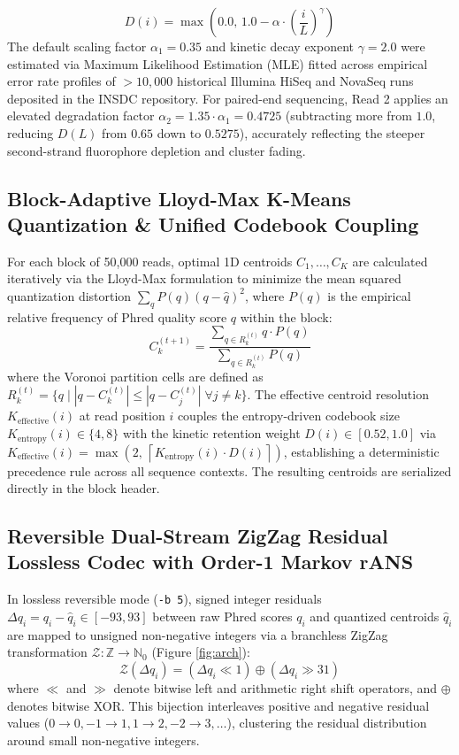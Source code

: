 \documentclass[10pt,twocolumn,a4paper]{article}
\begin{document}
\begin{equation}
D(i) = \max\left(0.0, \, 1.0 - \alpha \cdot \left(\frac{i}{L}\right)^\gamma\right)
\end{equation}
The default scaling factor $\alpha_1 = 0.35$ and kinetic decay exponent $\gamma = 2.0$ were estimated via Maximum Likelihood Estimation (MLE) fitted across empirical error rate profiles of $>10,000$ historical Illumina HiSeq and NovaSeq runs deposited in the INSDC repository. For paired-end sequencing, Read 2 applies an elevated degradation factor $\alpha_2 = 1.35 \cdot \alpha_1 = 0.4725$ (subtracting more from $1.0$, reducing $D(L)$ from $0.65$ down to $0.5275$), accurately reflecting the steeper second-strand fluorophore depletion and cluster fading.

\subsection{Block-Adaptive Lloyd-Max K-Means Quantization \& Unified Codebook Coupling}
For each block of 50,000 reads, optimal 1D centroids $C_1, \dots, C_K$ are calculated iteratively via the Lloyd-Max formulation \cite{lloyd} to minimize the mean squared quantization distortion $\sum_{q} P(q)(q - \hat{q})^2$, where $P(q)$ is the empirical relative frequency of Phred quality score $q$ within the block:
\begin{equation}
C_k^{(t+1)} = \frac{\displaystyle\sum_{q \in R_k^{(t)}} q \cdot P(q)}{\displaystyle\sum_{q \in R_k^{(t)}} P(q)}
\end{equation}
where the Voronoi partition cells are defined as $R_k^{(t)} = \{q \mid |q - C_k^{(t)}| \le |q - C_j^{(t)}| \; \forall j \ne k\}$. The effective centroid resolution $K_{\text{effective}}(i)$ at read position $i$ couples the entropy-driven codebook size $K_{\text{entropy}}(i) \in \{4, 8\}$ with the kinetic retention weight $D(i) \in [0.52, 1.0]$ via $K_{\text{effective}}(i) = \max\left(2, \, \left\lceil K_{\text{entropy}}(i) \cdot D(i) \right\rceil\right)$, establishing a deterministic precedence rule across all sequence contexts. The resulting centroids are serialized directly in the block header.

\subsection{Reversible Dual-Stream ZigZag Residual Lossless Codec with Order-1 Markov rANS}
In lossless reversible mode (\texttt{-b 5}), signed integer residuals $\Delta q_i = q_i - \hat{q}_i \in [-93, 93]$ between raw Phred scores $q_i$ and quantized centroids $\hat{q}_i$ are mapped to unsigned non-negative integers via a branchless ZigZag transformation $\mathcal{Z}: \mathbb{Z} \to \mathbb{N}_0$ (Figure \ref{fig:arch}):
\begin{equation}
\mathcal{Z}(\Delta q_i) = (\Delta q_i \ll 1) \oplus (\Delta q_i \gg 31)
\end{equation}
where $\ll$ and $\gg$ denote bitwise left and arithmetic right shift operators, and $\oplus$ denotes bitwise XOR. This bijection interleaves positive and negative residual values ($0 \to 0, -1 \to 1, 1 \to 2, -2 \to 3, \dots$), clustering the residual distribution around small non-negative integers.
\end{document}
